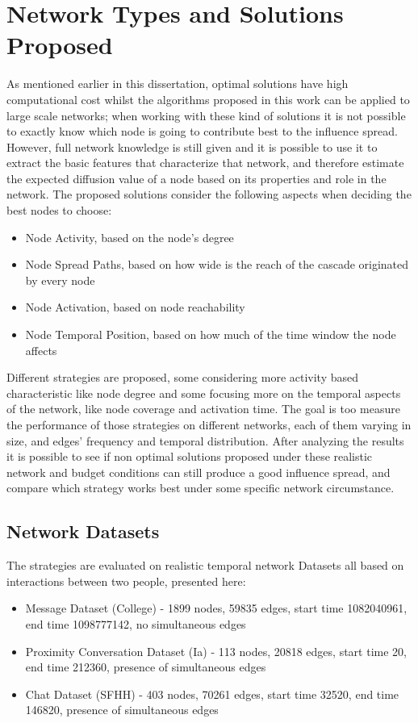 \chapter{Network Types and Solutions Proposed}
\label{cha:netsolutions}
As mentioned earlier in this dissertation, optimal solutions have high computational cost whilst the algorithms proposed in this work can be applied to large scale networks; when working with these kind of solutions it is not possible to exactly know which node is going to contribute best to the influence spread. However, full network knowledge is still given and it is possible to use it to extract the basic features that characterize that network, and therefore estimate the expected diffusion value of a node based on its properties and role in the network. The proposed solutions consider the following aspects when deciding the best nodes to choose:
\begin{itemize}
\item Node Activity, based on the node's degree
\item Node Spread Paths, based on how wide is the reach of the cascade originated by every node
\item Node Activation, based on node reachability
\item Node Temporal Position, based on how much of the time window the node affects
\end{itemize}

Different strategies are proposed, some considering more activity based characteristic like node degree and some focusing more on the temporal aspects of the network, like node coverage and activation time. The goal is too measure the performance of those strategies on different networks, each of them varying in size, and edges' frequency and temporal distribution. After analyzing the results it is possible to see if non optimal solutions proposed under these realistic network and budget conditions can still produce a good influence spread, and compare which strategy works best under some specific network circumstance.

\section{Network Datasets}
\label{sec:data}
The strategies are evaluated on realistic temporal network Datasets all based on interactions between two people, presented here:
\begin{itemize}
\item Message Dataset (College) - 1899 nodes, 59835 edges, start time 1082040961, end time 1098777142, no simultaneous edges
\item Proximity Conversation Dataset (Ia) - 113 nodes, 20818 edges, start time 20, end time 212360, presence of simultaneous edges
\item Chat Dataset (SFHH) - 403 nodes, 70261 edges, start time 32520, end time 146820, presence of simultaneous edges
\end{itemize}


